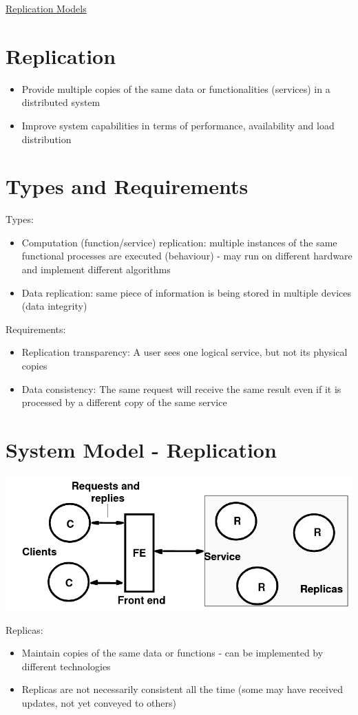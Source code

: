 \documentclass{article}[18pt]
\begin{document}
\begin{center}
\underline{\huge Replication Models}
\end{center}
\section{Replication}
\begin{itemize}
	\item Provide multiple copies of the same data or functionalities (services) in a distributed system
	\item Improve system capabilities in terms of performance, availability and load distribution
\end{itemize}
\section{Types and Requirements}
Types:
\begin{itemize}
	\item Computation (function/service) replication: multiple instances of the same functional processes are executed (behaviour) - may run on different hardware and implement different algorithms
	\item Data replication: same piece of information is being stored in multiple devices (data integrity)
\end{itemize}
Requirements:\begin{itemize}
	\item Replication transparency: A user sees one logical service, but not its physical copies
	\item Data consistency: The same request will receive the same result even if it is processed by a different copy of the same service
\end{itemize}
\section{System Model - Replication}
\begin{center}
	\includegraphics[scale=0.7]{"System Model"}
\end{center}
Replicas:
\begin{itemize}
	\item Maintain copies of the same data or functions - can be implemented by different technologies
	\item Replicas are not necessarily consistent all the time (some may have received updates, not yet conveyed to others)
\end{itemize}
\end{document}
